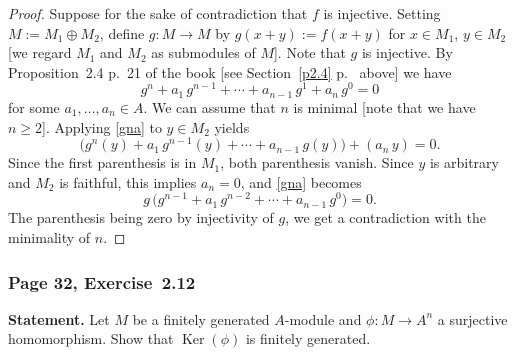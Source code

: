 \documentclass[12pt,letterpaper]{article}%
\newcommand{\oo}{\operatorname}\newcommand{\ooo}{\operatorname*}
\newcommand{\Ker}{\operatorname{Ker}}\newcommand{\Coker}{\operatorname{Coker}}
\newcommand{\nn}{\noindent}
\begin{document}
\begin{proof}
Suppose for the sake of contradiction that $f$ is injective. Setting $M:=M_1\oplus M_2$, define $g:M\to M$ by $g(x+y):=f(x+y)$ for $x\in M_1$, $y\in M_2$ [we regard $M_1$ and $M_2$ as submodules of $M$]. Note that $g$ is injective. By Proposition~2.4 p.~21 of the book [see Section~\ref{p2.4} p.~\pageref{p2.4} above] we have 
\begin{equation}\label{gna}
g^n+a_1\,g^{n-1}+\cdots+a_{n-1}\,g^1+a_n\,g^0=0
\end{equation} 
for some $a_1,\ldots,a_n\in A$. We can assume that $n$ is minimal [note that we have $n\ge2$]. Applying \eqref{gna} to $y\in M_2$ yields 
$$
\Big(g^n(y)+a_1\,g^{n-1}(y)+\cdots+a_{n-1}\,g(y)\Big)+(a_n\,y)=0.
$$ 
Since the first parenthesis is in $M_1$, both parenthesis vanish. Since $y$ is arbitrary and $M_2$ is faithful, this implies $a_n=0$, and \eqref{gna} becomes 
$$
g\,\Big(g^{n-1}+a_1\,g^{n-2}+\cdots+a_{n-1}\,g^0\Big)=0.
$$ 
The parenthesis being zero by injectivity of $g$, we get a contradiction with the minimality of $n$.
\end{proof}%

\subsubsection{Page 32, Exercise~2.12}%

\textbf{Statement.} Let $M$ be a finitely generated $A$-module and $\phi:M\to A^n$ a surjective homomorphism. Show that $\Ker(\phi)$ is finitely generated.

\nn[Let $e_1,\ldots,e_n$ be a basis of $A^n$ and choose $u_i\in M$ such that $\phi(u_i)=e_i$ ($1\le i\le n$). Show that $M$ is the direct sum of $\Ker(\phi)$ and the submodule generated by $u_1,\ldots,u_n$.]
\end{document}
